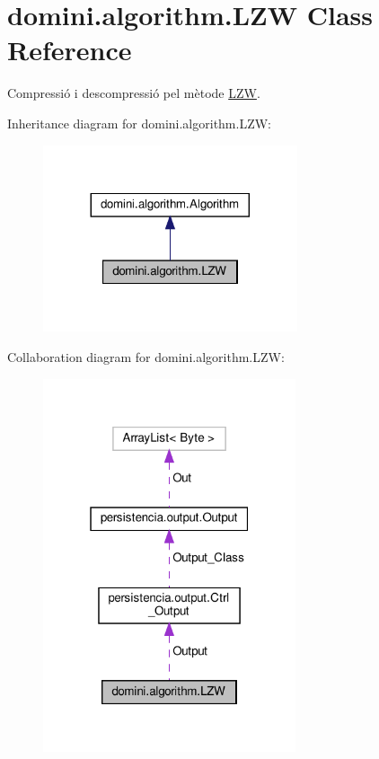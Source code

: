 \hypertarget{classdomini_1_1algorithm_1_1LZW}{}\section{domini.\+algorithm.\+L\+ZW Class Reference}
\label{classdomini_1_1algorithm_1_1LZW}


Compressió i descompressió pel mètode \hyperlink{classdomini_1_1algorithm_1_1LZW}{L\+ZW}.  




Inheritance diagram for domini.\+algorithm.\+L\+ZW\+:
\nopagebreak
\begin{figure}[H]
\begin{center}
\leavevmode
\includegraphics[width=212pt]{classdomini_1_1algorithm_1_1LZW__inherit__graph}
\end{center}
\end{figure}


Collaboration diagram for domini.\+algorithm.\+L\+ZW\+:\nopagebreak
\begin{figure}[H]
\begin{center}
\leavevmode
\includegraphics[width=211pt]{classdomini_1_1algorithm_1_1LZW__coll__graph}
\end{center}
\end{figure}
